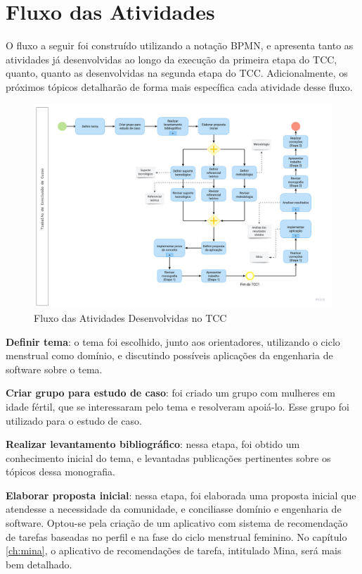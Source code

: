 \section{Fluxo das Atividades}

O fluxo a seguir foi construído utilizando a notação BPMN, e apresenta 
tanto as atividades já desenvolvidas ao longo da execução 
da primeira etapa do TCC, quanto, quanto as desenvolvidas na segunda etapa do TCC. 
Adicionalmente, os próximos tópicos detalharão de 
forma mais específica cada atividade desse fluxo.

\begin{figure}[ht]
	\caption{Fluxo das Atividades Desenvolvidas no TCC}
	\begin{center}
	\includegraphics[keepaspectratio=true,scale=0.19]{figuras/fluxodeatividades.png}
	\end{center}
    \label{fig03}
\end{figure}

\textbf{Definir tema}: o tema foi escolhido, junto aos orientadores, utilizando o ciclo 
menstrual como domínio, e discutindo
possíveis aplicações da engenharia de software sobre o tema. 

\textbf{Criar grupo para estudo de caso}: foi criado um grupo com mulheres em idade 
fértil, 
que se interessaram pelo tema e resolveram apoiá-lo. Esse grupo foi utilizado 
para o estudo de caso.

\textbf{Realizar levantamento bibliográfico}: nessa etapa, foi obtido um conhecimento 
inicial do tema, e levantadas publicações pertinentes sobre os tópicos dessa monografia. 

\textbf{Elaborar proposta inicial}: nessa etapa, foi elaborada uma proposta inicial que 
atendesse a necessidade da comunidade, e conciliasse domínio e engenharia de software. 
Optou-se pela criação de um aplicativo com sistema de recomendação de tarefas baseadas 
no perfil e
na fase do ciclo menstrual feminino. No capítulo \ref{ch:mina}, o aplicativo de recomendações de 
tarefa, intitulado Mina, será 
mais bem detalhado.

